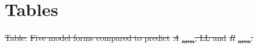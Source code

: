 \documentclass[
  12pt,
]{article}
\providecommand{\DIFdeltex}[1]{{\protect\color{red}\sout{#1}}}                      %
\providecommand{\DIFdelbegin}{} %
\providecommand{\DIFdel}[1]{\texorpdfstring{\DIFdeltex{#1}}{}} %
\newcommand{\DIFscaledelfig}{0.5}
\newlength{\DIFdelgraphicswidth} %
\newlength{\DIFdelgraphicsheight} %
\newcommand{\DIFdelincludegraphics}[2][]{%
\sbox{\DIFdelgraphicsbox}{\DIFOincludegraphics[#1]{#2}}%
\settoboxwidth{\DIFdelgraphicswidth}{\DIFdelgraphicsbox} %
\settoboxtotalheight{\DIFdelgraphicsheight}{\DIFdelgraphicsbox} %
\scalebox{\DIFscaledelfig}{%
\parbox[b]{\DIFdelgraphicswidth}{\usebox{\DIFdelgraphicsbox}\\[-\baselineskip] \rule{\DIFdelgraphicswidth}{0em}}\llap{\resizebox{\DIFdelgraphicswidth}{\DIFdelgraphicsheight}{%
\setlength{\unitlength}{\DIFdelgraphicswidth}%
\begin{picture}(1,1)%
\thicklines\linethickness{2pt} %
{\color[rgb]{1,0,0}\put(0,0){\framebox(1,1){}}}%
{\color[rgb]{1,0,0}\put(0,0){\line( 1,1){1}}}%
{\color[rgb]{1,0,0}\put(0,1){\line(1,-1){1}}}%
\end{picture}%
}\hspace*{3pt}}} %
} %
\DeclareRobustCommand{\DIFdelbegin}{\DIFOdelbegin \let\includegraphics\DIFdelincludegraphics} %
\begin{document}
\newpage

\hypertarget{tables}{%
\section{Tables}\label{tables}}

\DIFdelbegin %

\DIFdel{Table: }%
\DIFdel{Five model forms compared to predict }\emph{\DIFdel{A}}%
\DIFdel{\textsubscript{area}, LL and }\emph{\DIFdel{R}}%
\DIFdel{\textsubscript{area}.
}%
\end{document}
